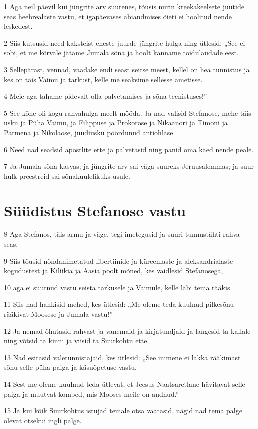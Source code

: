 \par 1 Aga neil päevil kui jüngrite arv suurenes, tõusis nurin kreekakeelsete juutide seas heebrealaste vastu, et igapäevases abiandmises õieti ei hoolitud nende leskedest.
\par 2 Siis kutsusid need kaksteist eneste juurde jüngrite hulga ning ütlesid: „See ei sobi, et me kõrvale jätame Jumala sõna ja hoolt kanname toidulaudade eest.
\par 3 Sellepärast, vennad, vaadake endi seast seitse meest, kellel on hea tunnistus ja kes on täis Vaimu ja tarkust, kelle me seaksime sellesse ametisse.
\par 4 Meie aga tahame pidevalt olla palvetamises ja sõna teenistuses!”
\par 5 See kõne oli kogu rahvahulga meelt mööda. Ja nad valisid Stefanose, mehe täis usku ja Püha Vaimu, ja Filippuse ja Prokorose ja Nikaanori ja Timoni ja Parmena ja Nikolaose, juudiusku pöördunud antiohlase.
\par 6 Need nad seadsid apostlite ette ja palvetasid ning panid oma käed nende peale.
\par 7 Ja Jumala sõna kasvas; ja jüngrite arv sai väga suureks Jeruusalemmas; ja suur hulk preestreid sai sõnakuulelikuks usule.

\section*{Süüdistus Stefanose vastu}

\par 8 Aga Stefanos, täis armu ja väge, tegi imetegusid ja suuri tunnustähti rahva seas.
\par 9 Siis tõusid nõndanimetatud libertiinide ja küreenlaste ja aleksandrialaste kogudustest ja Kiliikia ja Aasia poolt mõned, kes vaidlesid Stefanosega,
\par 10 aga ei suutnud vastu seista tarkusele ja Vaimule, kelle läbi tema rääkis.
\par 11 Siis nad hankisid mehed, kes ütlesid: „Me oleme teda kuulnud pilkesõnu rääkivat Moosese ja Jumala vastu!”
\par 12 Ja nemad õhutasid rahvast ja vanemaid ja kirjatundjaid ja langesid ta kallale ning võtsid ta kinni ja viisid ta Suurkohtu ette.
\par 13 Nad esitasid valetunnistajaid, kes ütlesid: „See inimene ei lakka rääkimast sõnu selle püha paiga ja käsuõpetuse vastu.
\par 14 Sest me oleme kuulnud teda ütlevat, et Jeesus Naatsaretlane hävitavat selle paiga ja muutvat kombed, mis Mooses meile on andnud.”
\par 15 Ja kui kõik Suurkohtus istujad temale otsa vaatasid, nägid nad tema palge olevat otsekui ingli palge.


